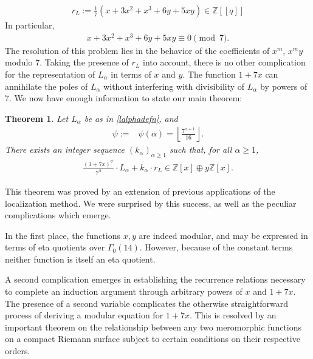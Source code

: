 \documentclass[reqno]{amsart}
\newtheorem{theorem}{Theorem}[section]
\theoremstyle{definition}
\theoremstyle{remark}
\numberwithin{equation}{section}
\begin{document}
\begin{align}
r_L := \frac{1}{7}\left( x+3x^2+x^3+6y+5xy \right)\in\mathbb{Z}[[q]]\label{rLisint}
\end{align}  In particular,
\begin{align*}
x+3x^2+x^3+6y+5xy\equiv 0\pmod{7}.
\end{align*}  The resolution of this problem lies in the behavior of the coefficients of $x^m$, $x^m y$ modulo 7.  Taking the presence of $r_L$ into account, there is no other complication for the representation of $L_{\alpha}$ in terms of $x$ and $y$.  The function $1+7x$ can annihilate the poles of $L_{\alpha}$ without interfering with divisibility of $L_{\alpha}$ by powers of 7.  We now have enough information to state our main theorem:

\begin{theorem}\label{Main}
Let $L_{\alpha}$ be as in \eqref{lalphadefn}, and
\begin{align}
\psi :=& \psi(\alpha) = \left\lfloor \frac{7^{\alpha+1}}{16} \right\rfloor.\label{psidefn}%
\end{align}  There exists an integer sequence $(k_{\alpha})_{\alpha\ge 1}$ such that, for all $\alpha\ge 1$, 
\begin{align*}
\frac{(1+7x)^{\psi}}{7^{\beta}}\cdot L_{\alpha} + k_{\alpha}\cdot r_L \in\mathbb{Z}[x]\oplus y\mathbb{Z}[x].
\end{align*}
\end{theorem}

This theorem was proved by an extension of previous applications of the localization method.  We were surprised by this success, as well as the peculiar complications which emerge.

In the first place, the functions $x,y$ are indeed modular, and may be expressed in terms of eta quotients over $\Gamma_0(14)$. However, because of the constant terms neither function is itself an eta quotient.

A second complication emerges in establishing the recurrence relations necessary to complete an induction argument through arbitrary powers of $x$ and $1+7x$.  The presence of a second variable complicates the otherwise straightforward process of deriving a modular equation for $1+7x$.  This is resolved by an important theorem on the relationship between any two meromorphic functions on a compact Riemann surface subject to certain conditions on their respective orders.
\end{document}
